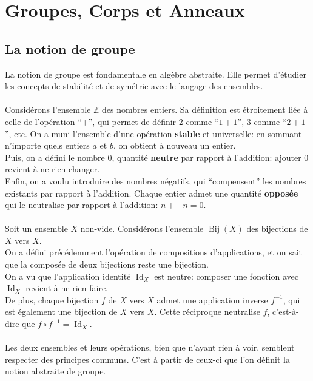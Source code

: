 \documentclass[oneside,12pt,french,table]{book}
\DeclareMathOperator{\id}{Id}
\DeclareMathOperator{\Bij}{Bij}
\newcommand{\Z}{\mathbb{Z}}
\theoremstyle{definition}
\theoremstyle{definition}
\theoremstyle{definition}
\begin{document}
\chapter{Groupes, Corps et Anneaux}
\section{La notion  de groupe}
La notion de groupe est fondamentale en algèbre abstraite. Elle permet d'étudier les concepts de stabilité et de symétrie avec le langage des ensembles. \\ \\
Considérons l'ensemble $\Z$ des nombres entiers. Sa définition est étroitement liée à celle de l'opération ``$+$'', qui permet de définir 2 comme ``$1+1$'', 3 comme ``$2+1$'', etc. On a muni l'ensemble d'une opération \textbf{stable} et universelle: en sommant n'importe quels entiers $a$ et $b$, on obtient à nouveau un entier. \\
Puis, on a défini le nombre $0$, quantité \textbf{neutre} par rapport à l'addition: ajouter $0$ revient à ne rien changer. \\
Enfin, on a voulu introduire des nombres négatifs, qui ``compensent'' les nombres existants par rapport à l'addition. Chaque entier admet une quantité \textbf{opposée} qui le neutralise par rapport à l'addition: $n + -n = 0$. \\ \\
Soit un ensemble $X$ non-vide. Considérons l'ensemble $\Bij(X)$ des bijections de $X$ vers $X$. \\
On a défini précédemment l'opération de compositions d'applications, et on sait que la composée de deux bijections reste une bijection. \\
On a vu que l'application identité $\id_X$ est neutre: composer une fonction avec $\id_X$ revient à ne rien faire. \\
De plus, chaque bijection $f$ de $X$ vers $X$ admet une application inverse $f^{-1}$, qui est également une bijection de $X$ vers $X$. Cette réciproque neutralise $f$, c'est-à-dire que $f \circ f^{-1} = \id_X$. \\ \\
Les deux ensembles et leurs opérations, bien que n'ayant rien à voir, semblent respecter des principes communs. C'est à partir de ceux-ci que l'on définit la notion abstraite de groupe.
\end{document}
